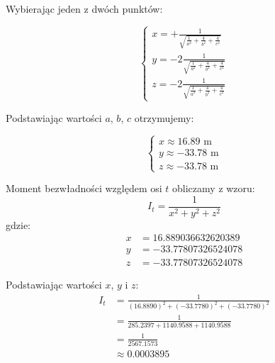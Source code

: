 \documentclass[a4paper,12pt]{article}
\begin{document}
Wybierając jeden z dwóch punktów:


\[
    \begin{cases}
        x = +\frac{1}{\sqrt{\frac{1}{a^2} + \frac{4}{b^2} + \frac{4}{c^2}}}  \\
        y = -2\frac{1}{\sqrt{\frac{1}{a^2} + \frac{4}{b^2} + \frac{4}{c^2}}} \\
        z = -2\frac{1}{\sqrt{\frac{1}{a^2} + \frac{4}{b^2} + \frac{4}{c^2}}}
    \end{cases}
\]

Podstawiając wartości $a$, $b$, $c$ otrzymujemy:






\begin{equation*}
    \begin{cases}
        x \approx 16.89\text{ m}  \\
        y \approx -33.78\text{ m} \\
        z \approx -33.78\text{ m}
    \end{cases}
\end{equation*}



Moment bezwładności względem osi $t$ obliczamy z wzoru:
\[
    I_t = \frac{1}{x^2 + y^2 + z^2}
\]
gdzie:
\begin{align*}
    x & = 16.889036632620389 \\
    y & = -33.77807326524078 \\
    z & = -33.77807326524078
\end{align*}

Podstawiając wartości $x$, $y$ i $z$:
\begin{align*}
    I_t & = \frac{1}{(16.8890)^2 + (-33.7780)^2 + (-33.7780)^2} \\
        & = \frac{1}{285.2397 + 1140.9588 + 1140.9588}          \\
        & = \frac{1}{2567.1573}                                 \\
        & \approx 0.0003895
\end{align*}
\end{document}
